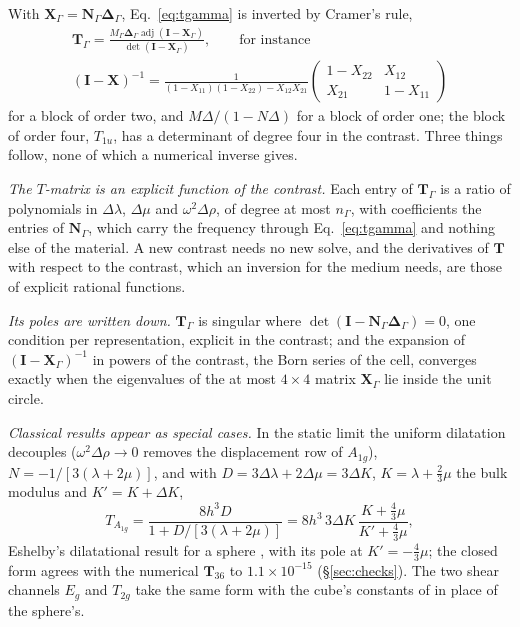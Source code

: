 \documentclass[11pt,a4paper]{article}
\newcommand{\bN}{\mathbf{N}}
\newcommand{\bT}{\mathbf{T}}
\newcommand{\bI}{\mathbf{I}}
\newcommand{\bD}{\boldsymbol{\Delta}}
\begin{document}
With $\mathbf X_\Gamma=\bN_\Gamma\bD_\Gamma$, Eq.~\eqref{eq:tgamma} is inverted by Cramer's rule,
\begin{equation}\label{eq:cramer}
\begin{gathered}
  \bT_\Gamma=\frac{M_\Gamma\bD_\Gamma\operatorname{adj}(\bI-\mathbf X_\Gamma)}{\det(\bI-\mathbf X_\Gamma)},
  \qquad\text{for instance}\\[4pt]
  (\bI-\mathbf X)^{-1}=\frac{1}{(1-X_{11})(1-X_{22})-X_{12}X_{21}}
  \begin{pmatrix}1-X_{22}&X_{12}\\X_{21}&1-X_{11}\end{pmatrix}
\end{gathered}
\end{equation}
for a block of order two, and $M\Delta/(1-N\Delta)$ for a block of order one; the block of order four,
$T_{1u}$, has a determinant of degree four in the contrast. Three things follow, none of which a numerical
inverse gives.

\emph{The $T$-matrix is an explicit function of the contrast.} Each entry of $\bT_\Gamma$ is a ratio of
polynomials in $\Delta\lambda$, $\Delta\mu$ and $\omega^2\Delta\rho$, of degree at most $n_\Gamma$, with
coefficients the entries of $\bN_\Gamma$, which carry the frequency through Eq.~\eqref{eq:tgamma} and nothing
else of the material. A new contrast needs no new solve, and the derivatives of $\bT$ with respect to the
contrast, which an inversion for the medium needs, are those of explicit rational functions.

\emph{Its poles are written down.} $\bT_\Gamma$ is singular where $\det(\bI-\bN_\Gamma\bD_\Gamma)=0$, one
condition per representation, explicit in the contrast; and the expansion of $(\bI-\mathbf X_\Gamma)^{-1}$
in powers of the contrast, the Born series of the cell, converges exactly when the eigenvalues of the at most
$4\times4$ matrix $\mathbf X_\Gamma$ lie inside the unit circle.

\emph{Classical results appear as special cases.} In the static limit the uniform dilatation decouples
($\omega^2\Delta\rho\to0$ removes the displacement row of $A_{1g}$), $N=-1/[3(\lambda+2\mu)]$, and with
$D=3\Delta\lambda+2\Delta\mu=3\Delta K$, $K=\lambda+\tfrac23\mu$ the bulk modulus and $K'=K+\Delta K$,
\begin{equation}\label{eq:eshelby}
  T_{A_{1g}}=\frac{8h^3D}{1+D/[3(\lambda+2\mu)]}
  =8h^3\,3\Delta K\,\frac{K+\tfrac43\mu}{K'+\tfrac43\mu},
\end{equation}
Eshelby's dilatational result for a sphere \citep{Eshelby1957}, with its pole at $K'=-\tfrac43\mu$; the
closed form agrees with the numerical $\bT_{36}$ to $1.1\times10^{-15}$ (\S\ref{sec:checks}). The two shear channels $E_g$ and $T_{2g}$
take the same form with the cube's constants of \citet{NestorCoupling2026} in place of the sphere's.
\end{document}
